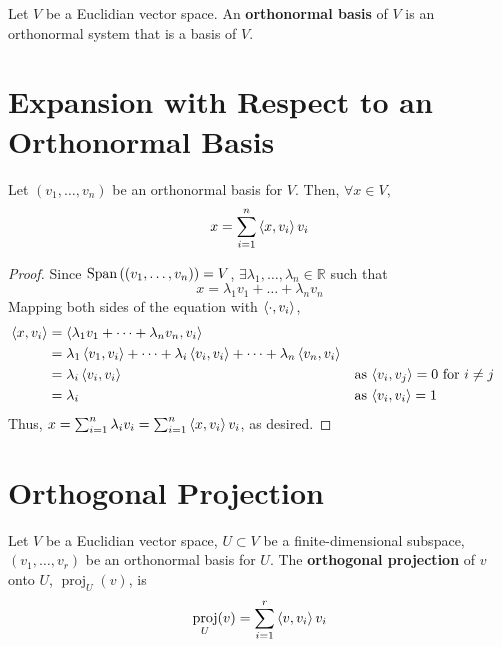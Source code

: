 \documentclass[letterpaper,12pt]{article}
\DeclareMathOperator{\proj}{proj}
\begin{document}
\begin{definition}
Let $V$ be a Euclidian vector space. An \textbf{orthonormal basis} of $V$ is an orthonormal system that is a basis of $V$.
\end{definition}

\section*{Expansion with Respect to an Orthonormal Basis}
\begin{theorem}
Let $(v_1, \dots, v_n)$ be an orthonormal basis for $V$. Then, $\forall x \in V$,
\begin{align*}
    x = \sum_{i=1}^n \left< x, v_i \right> v_i
\end{align*}
\end{theorem}
\begin{proof}
Since $\text{Span}\left((v_1, \dots, v_n) \right) = V$, $\exists \lambda_1, \dots, \lambda_n \in \mathbb{R}$ such that
\begin{equation*}
    x = \lambda_1 v_1 + \dots + \lambda_n v_n
\end{equation*}
Mapping both sides of the equation with $\left< \cdot, v_i \right>$,
\begin{align*}
    \left< x, v_i \right> & = \left< \lambda_1 v_1 + \dots + \lambda_n v_n, v_i \right> \\
    & = \lambda_1 \left< v_1, v_i \right> + \dots + \lambda_i \left< v_i, v_i \right> + \dots + \lambda_n \left< v_n, v_i \right> \\
    & = \lambda_i \left< v_i, v_i \right> && \text{as $\left< v_i, v_j \right> = 0$ for $i \neq j$} \\
    & = \lambda_i && \text{as $\left< v_i, v_i \right> = 1$}
\end{align*}
Thus, $x = \sum_{i=1}^n \lambda_i v_i = \sum_{i=1}^n \left< x, v_i \right> v_i$, as desired.
\end{proof}

\section*{Orthogonal Projection}
\begin{definition}
Let $V$ be a Euclidian vector space, $U \subset V$ be a finite-dimensional subspace, $(v_1, \dots, v_r)$ be an orthonormal basis for $U$. The \textbf{orthogonal projection} of $v$ onto $U$, $\proj_{U}(v)$, is
\begin{equation*}
    \proj_{U}(v) = \sum_{i=1}^r \inp{v}{v_i} v_i
\end{equation*}
\end{definition}
\end{document}
